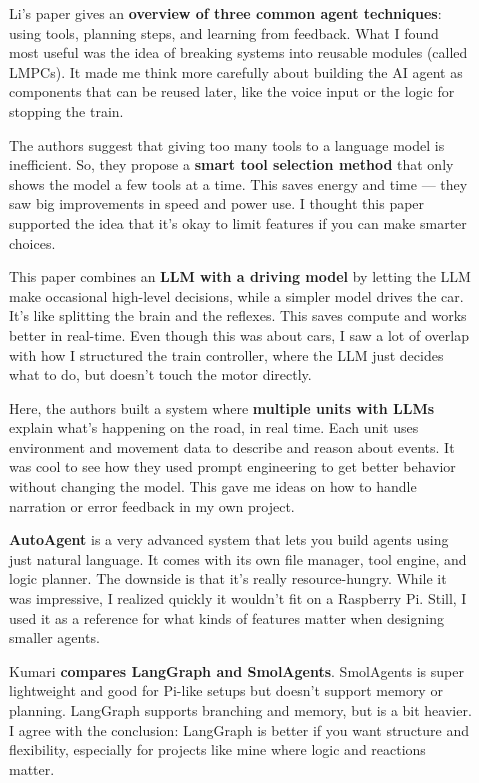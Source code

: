 \begin{description}
\item[\cite{li_review_2024}]
Li's paper gives an \textbf{overview of three common agent techniques}: using tools, planning steps, and learning from feedback. What I found most useful was the idea of breaking systems into reusable modules (called LMPCs). It made me think more carefully about building the AI agent as components that can be reused later, like the voice input or the logic for stopping the train.

\item[\cite{paramanayakam_less_2024}]
The authors suggest that giving too many tools to a language model is inefficient. So, they propose a \textbf{smart tool selection method} that only shows the model a few tools at a time. This saves energy and time — they saw big improvements in speed and power use. I thought this paper supported the idea that it's okay to limit features if you can make smarter choices.

\item[\cite{dong_generalizing_2024}]
This paper combines an \textbf{LLM with a driving model} by letting the LLM make occasional high-level decisions, while a simpler model drives the car. It's like splitting the brain and the reflexes. This saves compute and works better in real-time. Even though this was about cars, I saw a lot of overlap with how I structured the train controller, where the LLM just decides what to do, but doesn’t touch the motor directly.

\item[\cite{huang_efficient_2024}]
Here, the authors built a system where \textbf{multiple units with LLMs} explain what’s happening on the road, in real time. Each unit uses environment and movement data to describe and reason about events. It was cool to see how they used prompt engineering to get better behavior without changing the model. This gave me ideas on how to handle narration or error feedback in my own project.

\item[\cite{tang_autoagent_2025}]
\textbf{AutoAgent} is a very advanced system that lets you build agents using just natural language. It comes with its own file manager, tool engine, and logic planner. The downside is that it's really resource-hungry. While it was impressive, I realized quickly it wouldn't fit on a Raspberry Pi. Still, I used it as a reference for what kinds of features matter when designing smaller agents.

\item[\cite{kumari_smolagents_2025}]
Kumari \textbf{compares LangGraph and SmolAgents}. SmolAgents is super lightweight and good for Pi-like setups but doesn’t support memory or planning. LangGraph supports branching and memory, but is a bit heavier. I agree with the conclusion: LangGraph is better if you want structure and flexibility, especially for projects like mine where logic and reactions matter.
\end{description}

